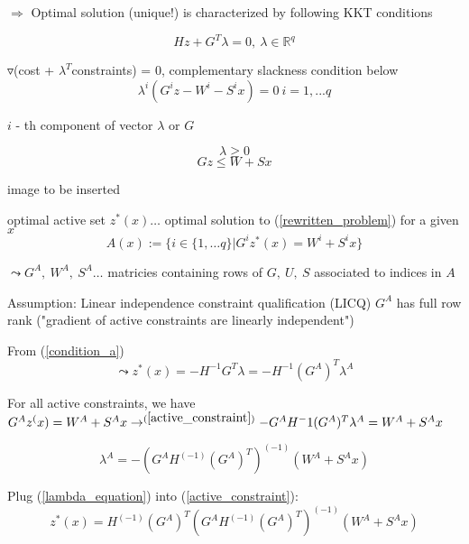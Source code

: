 $\Rightarrow$ Optimal solution (unique!) is characterized by following KKT conditions

\begin{equation}\label{condition_a}
Hz + G^T\lambda = 0, \ \lambda \in \mathbb{R}^q
\end{equation}

$\triangledown$(cost + $\lambda^T$constraints) = 0, complementary slackness condition below
\begin{equation}\label{condition_b}
\lambda^i(G^iz - W^i-S^ix) = 0 \ i=1, ...q
\end{equation}

$i$ - th component of vector $\lambda$ or $G$

\begin{equation}\label{condition_c}
\lambda \geq 0
\end{equation}
\begin{equation}\label{condition_d}
Gz \leq W + Sx
\end{equation}

image to be inserted

\begin{Definition}
optimal active set $z^*(x) \dots$ optimal solution to (\ref{rewritten_problem}) for a given $x$
\begin{equation*}
A(x) := \{ i \in \{1, \dots q\} | G^iz^*(x) = W^i + S^ix \}
\end{equation*}

$\leadsto G^A, \ W^A, \ S^A \dots$ matricies containing rows of $G, \ U, \ S$ associated to indices in $A$ 
\end{Definition}

Assumption: Linear independence constraint qualification (LICQ) $G^A$ has full row rank ("gradient of active constraints are linearly independent")

From (\ref{condition_a}) 
\begin{equation}\label{active_constraint}
\leadsto z^*(x) = -H^{-1}G^T\lambda = -H^{-1}(G^A)^T\lambda^A
\end{equation}

For all active constraints, we have $G^Az^(x) = W^A + S^Ax \to^{(\ref{active_constraint})} - G^AH^-1(G^A)^T\lambda^A = W^A+S^Ax$

\begin{equation}\label{lambda_equation}
\lambda^A = - (G^AH^(-1)(G^A)^T)^(-1)(W^A+S^Ax)
\end{equation} 

Plug (\ref{lambda_equation}) into (\ref{active_constraint}):
\begin{equation}\label{optimal_z}
z^*(x) = H^(-1)(G^A)^T(G^AH^(-1)(G^A)^T)^(-1)(W^A + S^Ax)
\end{equation}

